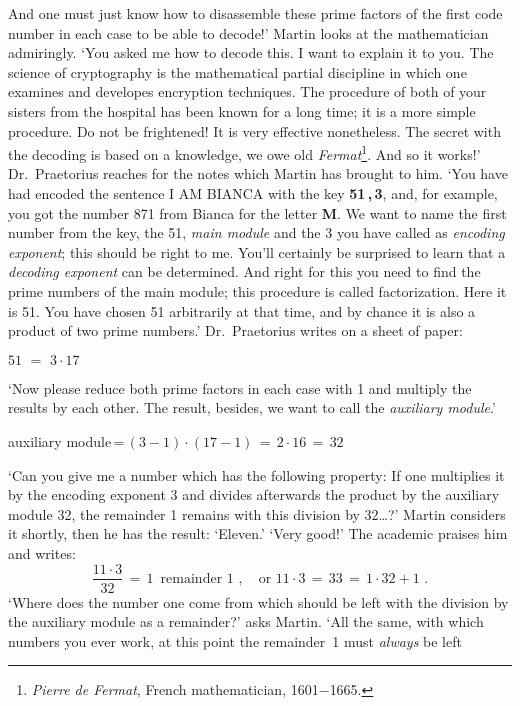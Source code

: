 And one must just know how to disassemble these prime factors of the first code number in each case to be able to decode!' 
Martin looks at the mathematician admiringly.
`You asked me how to decode this.
I want to explain it to you. 
The science of cryptography is the mathematical partial discipline in which one examines and developes encryption 
techniques. The procedure of both of your sisters from the hospital has been known for a long time; it is a more 
simple procedure. 
Do not be frightened! It is very effective nonetheless. 
The secret with the decoding is based on a knowledge, we owe old {\em Fermat\/}\footnote{{\em Pierre de Fermat\/}, 
French mathematician, 1601$-$1665.}. And so it works!' 
Dr.~Praetorius reaches for the notes which Martin has brought to him. 
`You have had encoded the sentence I AM BIANCA with the key {\bf 51\,,\,3}, and, for example, you got the number 871 
from Bianca for the letter {\bf M}.
We want to name the first number from the key, the 51, {\em main module\/} and the 3 you have called 
as {\em encoding exponent\/}; this should be right to me. 
You'll certainly be surprised to learn that a {\em decoding exponent\/} can be determined. 
And right for this you need to find the prime numbers of the main module; this procedure is called factorization.
Here it is 51. You have chosen 51 arbitrarily at that time, and by chance it is also a product of two prime numbers.' 
Dr.~Praetorius writes on a sheet of paper: 
\begin{center} 
\(51 \, \, = \, \, 3\cdot 17 \) 
\end{center} 
`Now please reduce both prime factors in each case with 1 and multiply the results by each other. 
The result, besides, we want to call the {\em auxiliary module\/}.' 
\begin{center} 
auxiliary module\,=\,\((3-1)\cdot (17-1)\,=\,2\cdot 16 \,=\,32 \)
\end{center}
`Can you give me a number which has the following property: 
If one multiplies it by the encoding exponent 3 and divides afterwards the product by the auxiliary module 32, 
the remainder 1 remains with this division by 32\dots?'
Martin considers it shortly, then he has the result: `Eleven.' 
`Very good!' The academic praises him and writes: 
\[
\frac{11\cdot 3}{32}\,=\,1 \,\,\,\mbox{remainder}\,\,1\,\,,\quad \mbox{or}\,\,
11\cdot 3\,=\,33\,=\,1\cdot 32 + \mbox{1}\,\,.
\]
`Where does the number one come from which should be left with the division by the auxiliary module as a 
remainder?' asks Martin. 
`All the same, with which numbers you ever work, at this point the remainder~1 must {\em always\/} be left 
